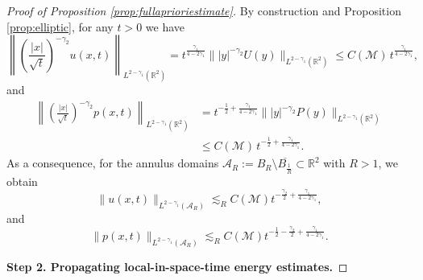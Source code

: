 \documentclass[12pt,reqno]{amsart}
\theoremstyle{plain}
\theoremstyle{definition}
\newcommand{\R}{\mathbb{R}}
\newcommand{\M}{\mathcal{M}}
\newcommand{\A}{\mathcal{A}}
\newcommand{\les}{\lesssim}
\renewcommand{\:}{\colon}
\numberwithin{equation}{section}
\numberwithin{figure}{section}
\begin{document}
\begin{proof}[Proof of Proposition \ref{prop:fullaprioriestimate}]
  By construction and Proposition \ref{prop:elliptic}, for any $t>0$ we have
\begin{equation}
    \left\|\left(\frac{|x|}{\sqrt{t}}\right)^{-{\gamma_2}} u(x,t)\right\|_{L^{2-{\gamma_1}}(\R^2)} = t^{\frac{{\gamma_1}}{4-2{\gamma_1}} }   \||y|^{-\gamma_2} U(y)\|_{L^{2-\gamma_1}(\R^2)} \le C(\M) \, t^{\frac{{\gamma_1}}{4-2{\gamma_1}} },
\end{equation}
and
\begin{align}
    \left\|\left(\frac{|x|}{\sqrt{t}}\right)^{-{\gamma_2}} p(x,t)\right\|_{L^{2-{\gamma_1}}(\R^2)} &=  t^{-\frac12 + \frac{{\gamma_1}}{4-2{\gamma_1}} }  \||y|^{-\gamma_2} P(y)\|_{L^{2-\gamma_1}(\R^2)} \nonumber \\
    &\le C(\M) \, t^{-\frac12 + \frac{{\gamma_1}}{4-2{\gamma_1}} }.
\end{align}
As a consequence, for the annulus domains $\A_R := B_R \setminus \overline{B_{\frac{1}{R}}} \subset \R^2$ with $R>1$, we obtain
\begin{equation} \label{eq:u-MU}
    \| u(x, t)\|_{L^{2-{\gamma_1}}(\A_R)} \les_{R} C(\M)  t^{ - \frac{{\gamma_2}}{2} + \frac{{\gamma_1}}{4-2{\gamma_1}}} ,
\end{equation}
and
\begin{equation} \label{eq:p-MP}
    \| p(x, t)\|_{L^{2-{\gamma_1}}(\A_R)} \les_{R} C(\M) t^{-\frac12 - \frac{{\gamma_2}}{2} + \frac{{\gamma_1}}{4-2{\gamma_1}}}.
\end{equation}

\smallskip
\textbf{Step 2. Propagating local-in-space-time energy estimates.}
\smallskip


\end{proof}
\end{document}
